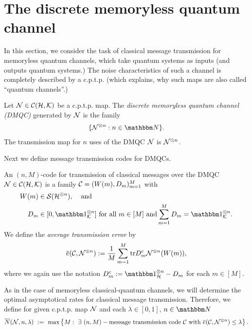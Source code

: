      \section{The discrete memoryless quantum channel} \label{sect:dmqc_coding}
     In this section, we consider the task of classical message transmission for memoryless quantum channels, which take quantum systems as inputs (and outputs quantum systems.) The noise characteristics of such a channel is completely described
     by a c.p.t.p. (which explains, why such maps are also called ``quantum channels''.) 
     \begin{definition}
      Let ${\mathcal N} \in {\mathcal C}({\mathcal H}, {\mathcal K})$ be a c.p.t.p. map. The \emph{discrete memoryless quantum channel (DMQC)} generated by ${\mathcal N}$ is the family
      \begin{align}
       \{\cN^{\otimes n}: n \in \bbmN \}.
      \end{align}
     The transmission map for $n$ uses of the DMQC ${\mathcal N}$ is ${\mathcal N}^{\otimes n}$. 
     \end{definition}
     Next we define message transmission codes for DMQCs. 
     \begin{definition} 
     An $(n,M)$-code for transmission of classical messages over the DMQC ${\mathcal N} \in {\mathcal C}({\mathcal H},{\mathcal K})$ is a family ${\mathcal C} = (W(m), D_m)_{m=1}^M$ with
     \begin{align*}
      W(m)  & \in \cS(\cH^{\otimes n}), \hspace{.4cm} \text{and} \\
      D_m   & \in [0, \bbmeins_{\cK}^{\otimes n}] \ \text{for all} \ m \in [M] \ \text{and} \sum_{m=1}^M D_m = \bbmeins_{\cK}^{\otimes n}.
     \end{align*}
     We define the \emph{average transmission error} by 
     \begin{align}
      \overline{e}({\mathcal C}, {\mathcal N}^{\otimes n}) := \frac{1}{M} \sum_{m=1}^M \mathrm{tr} D_m^c {\mathcal N}^{\otimes n}(W(m)),
     \end{align}
     where we again use the notation $D_m^c := \bbmeins_{\cH}^{\otimes n} - D_m$ for each $m \in [M]$.
     \end{definition}
      As in the case of memoryless classical-quantum channels, we will determine the optimal asymptotical rates for classical message transmission. Therefore, we define for given c.p.t.p. map ${\mathcal N}$ and each
      $\lambda \in [0,1]$, $n \in \bbmN$
     \begin{align*}
      \overline{N}(\cN, n, \lambda) \ := \ \max \left\{M: \ \exists  \ (n,M)-\text{message transmission code}\ \cC \ \text{with}\ \overline{e}(\cC, \cN^{\otimes n}) \leq \lambda \right\}.  
     \end{align*}
